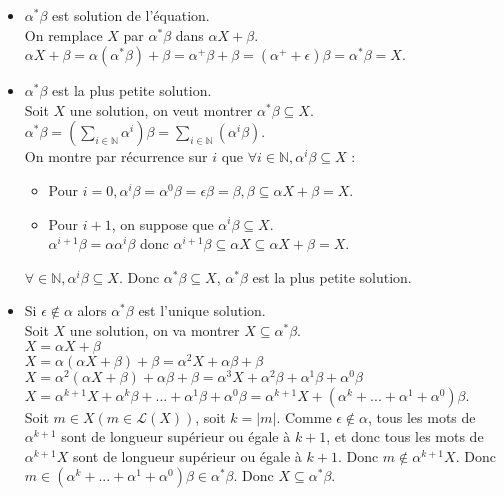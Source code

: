 \begin{itemize}
	\item $\alpha^* \beta$ est solution de l'équation.\\

	On remplace $X$ par $\alpha^* \beta$ dans $\alpha X + \beta$.\\
	$\alpha X + \beta = \alpha(\alpha^* \beta) + \beta = \alpha^+ \beta + \beta = (\alpha^+ + \epsilon)\beta = \alpha^* \beta=X$.\\
	
	\item $\alpha^* \beta$ est la plus petite solution.\\
	Soit $X$ une solution, on veut montrer $\alpha^* \beta \subseteq X$.\\
	$\alpha^* \beta = (\sum\limits_{i \in \mathbb{N}} \alpha^i)\beta = \sum\limits_{i \in \mathbb{N}}(\alpha^i \beta)$.\\
	On montre par récurrence sur $i$ que $\forall i \in \mathbb{N}, \alpha^i\beta \subseteq X$ :
	
	\begin{itemize}
		\item Pour $i=0, \alpha^i \beta = \alpha^0 \beta = \epsilon \beta = \beta, \beta \subseteq \alpha X + \beta = X$.
		\item Pour $i+1$, on suppose que $\alpha^i \beta \subseteq X$.\\
		$\alpha^{i+1} \beta = \alpha \alpha^i \beta$ donc $\alpha^{i+1} \beta \subseteq \alpha X \subseteq \alpha X + \beta = X$.\\
	\end{itemize}
	
	$\forall \in \mathbb{N}, \alpha^i \beta \subseteq X$. Donc $\alpha^* \beta \subseteq X$, $\alpha^* \beta$ est la plus petite solution.\\

	\item Si $\epsilon \not \in \alpha$ alors $\alpha^* \beta$ est l'unique solution.\\

	Soit $X$ une solution, on va montrer $X \subseteq \alpha^* \beta$.\\
	$X = \alpha X + \beta$\\
	$X = \alpha(\alpha X + \beta)+\beta = \alpha^2 X + \alpha \beta + \beta$\\
	$X = \alpha^2(\alpha X + \beta) + \alpha \beta + \beta = \alpha^3 X + \alpha^2 \beta + \alpha^1 \beta + \alpha^0 \beta$\\
	$X = \alpha^{k+1} X + \alpha^k \beta + ... + \alpha^1 \beta + \alpha^0 \beta = \alpha^{k+1} X + (\alpha^k + ... + \alpha^1 + \alpha^0) \beta$.\\

	Soit $m \in X (m \in \mathcal{L}(X))$, soit $k = \left|m\right|$. Comme $\epsilon \not \in \alpha$, tous les mots de $\alpha^{k+1}$ sont de longueur supérieur ou égale à $k+1$, et donc tous les mots de $\alpha^{k+1} X $ sont de longueur supérieur ou égale à $k+1$. Donc $m \not \in \alpha^{k+1} X$. Donc $m \in (\alpha^k + ... + \alpha^1 + \alpha^0)\beta \in \alpha^* \beta$. Donc $X \subseteq \alpha^* \beta$.\\
\end{itemize}

